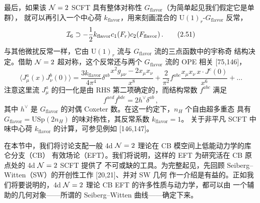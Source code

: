 最后，如果该 $\mathcal{N}=2$ SCFT 具有整体对称性 $G_{\mathrm{flavor}}$（为简单起见我们假定它是单群），
就可以再引入一个中心荷 $k_{\mathrm{flavor}}$，用来刻画混合的
$\mathrm{U}(1)_r$-$G_{\mathrm{flavor}}$ 反常，
\begin{equation}
  \mathcal{I}_6\supset-\frac{1}{2}k_{\mathrm{flavor}}c_1(F_r)c_2(F_{\mathrm{flavor}})\,.
  \tag{2.51}
\end{equation}
与其他微扰反常一样，它由 $\mathrm{U}(1)_r$ 流与 $G_{\mathrm{flavor}}$ 流的三点函数中的宇称奇
结构决定。借助 $\mathcal{N}=2$ 超对称，这个反常还与两个 $G_{\mathrm{flavor}}$ 流的 OPE 相关 [75,146]，
\begin{equation}
  \langle J^a_\mu(x)J^b_\nu(0)\rangle
  =\frac{3k_{\mathrm{flavor}}}{4\pi^4}\delta^{ab}\frac{x^2g_{\mu\nu}-2x_\mu x_\nu}{x^8}
  +\frac{2}{\pi^2}f^{abc}\frac{x_\mu x_\nu\,x\cdot J^c(0)}{x^6}+\dots
  \tag{2.52}
\end{equation}
注意这里流 $J^a_\mu$ 的归一化是由 RHS 第二项确定的，而结构常数 $f^{abc}$ 满足
\begin{equation}
  f^{aed}f^{bde}=2h^{\vee}\delta^{ab}\,,
  \tag{2.53}
\end{equation}
其中 $h^{\vee}$ 是 $G_{\mathrm{flavor}}$ 的对偶 Coxeter 数。在这一约定下，$n_H$ 个自由超多重态
具有 $G_{\mathrm{flavor}}=\mathrm{USp}(2n_H)$ 的味对称性，其反常系数 $k_{\mathrm{flavor}}=1$。
关于非平凡 SCFT 中味中心荷 $k_{\mathrm{flavor}}$ 的计算，可参见例如 [146,147]。



在本节中，我们将讨论支配一般 4d $\mathcal{N}=2$ 理论在 CB 模空间上低能动力学的库仑分支（CB）
有效场论（EFT）。我们将说明，这样的 EFT 为研究活在 CB 原点处的 4d $\mathcal{N}=2$ SCFT 提供了
不可或缺的工具。为完整起见，先回顾 Seiberg--Witten（SW）的开创性工作 [20,21]、并对 SW 几何
作一介绍是有益的。正如我们将要说明的，4d $\mathcal{N}=2$ 理论 CB EFT 的许多性质与动力学，都可以由
一个辅助的几何对象——所谓的 Seiberg--Witten 曲线——确定下来。

